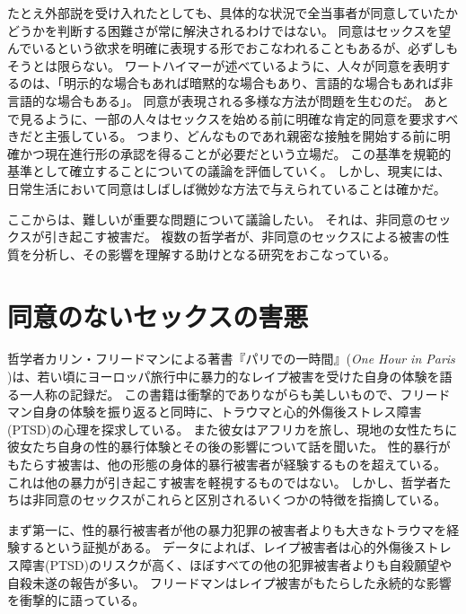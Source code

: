 \documentclass[paper=a4,book,openany]{jlreq}
\newcommand{\ig}[1]{}           %
\begin{document}
たとえ外部説を受け入れたとしても、具体的な状況で全当事者が同意していたかどうかを判断する困難さが常に解決されるわけではない。
同意はセックスを望んでいるという欲求を明確に表現する形でおこなわれることもあるが、必ずしもそうとは限らない。
ワートハイマーが述べているように、人々が同意を表明するのは、「明示的な場合もあれば暗黙的な場合もあり、言語的な場合もあれば非言語的な場合もある」\citep[p.346]{wertheimer03:_consen_sexual_relat}。
同意が表現される多様な方法が問題を生むのだ。
あとで見るように、一部の人々はセックスを始める前に明確な肯定的同意を要求すべきだと主張している。
つまり、どんなものであれ親密な接触を開始する前に明確かつ現在進行形の承認を得ることが必要だという立場だ。
この基準を規範的基準として確立することについての議論を評価していく。
しかし、現実には、日常生活において同意はしばしば微妙な方法で与えられていることは確かだ。

ここからは、難しいが重要な問題について議論したい。
それは、非同意のセックスが引き起こす被害だ。
複数の哲学者が、非同意のセックスによる被害の性質を分析し、その影響を理解する助けとなる研究をおこなっている。

\section{同意のないセックスの害悪}

哲学者カリン・フリードマン\ig{Karyn L. Freedman}による著書『パリでの一時間』(\emph{One Hour in Paris} \citep{freedman14:_one_hour_paris})は、若い頃にヨーロッパ旅行中に暴力的なレイプ被害を受けた自身の体験を語る一人称の記録だ。
この書籍は衝撃的でありながらも美しいもので、フリードマン自身の体験を振り返ると同時に、トラウマと心的外傷後ストレス障害(PTSD)の心理を探求している。
また彼女はアフリカを旅し、現地の女性たちに彼女たち自身の性的暴行体験とその後の影響について話を聞いた。
性的暴行がもたらす被害は、他の形態の身体的暴行被害者が経験するものを超えている。
これは他の暴力が引き起こす被害を軽視するものではない。
しかし、哲学者たちは非同意のセックスがこれらと区別されるいくつかの特徴を指摘している。

まず第一に、性的暴行被害者が他の暴力犯罪の被害者よりも大きなトラウマを経験するという証拠がある。
データによれば、レイプ被害者は心的外傷後ストレス障害(PTSD)のリスクが高く、ほぼすべての他の犯罪被害者よりも自殺願望や自殺未遂の報告が多い\citep[p.104]{wertheimer03:_consen_sexual_relat}。
フリードマン\ig{Karyn L. Freedman}はレイプ被害がもたらした永続的な影響を衝撃的に語っている。
\end{document}
